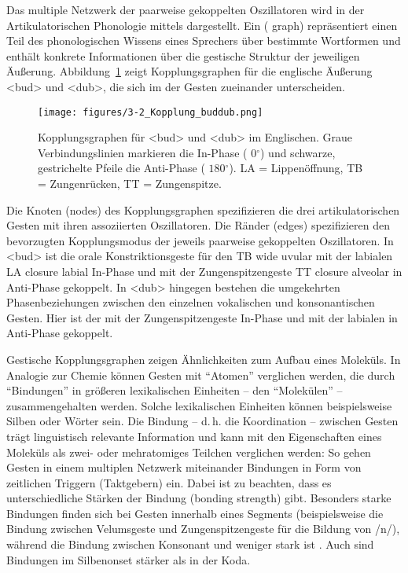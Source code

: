 Das multiple Netzwerk der paarweise gekoppelten Oszillatoren wird in der Artikulatorischen Phonologie mittels  dargestellt. Ein  ( graph) repräsentiert einen Teil des phonologischen Wissens eines Sprechers über bestimmte Wortformen \citep{Goldstein2007a} und enthält konkrete Informationen über die gestische Struktur der jeweiligen Äußerung. Abbildung~\ref{figure:0302} zeigt Kopplungsgraphen für die englische Äußerung <bud> und <dub>, die sich im  der Gesten zueinander unterscheiden. 


\begin{figure}[ht]
	\texttt{[image: figures/3-2\_Kopplung\_buddub.png]}
	\caption{Kopplungsgraphen für <bud> und <dub> im Englischen. Graue Verbindungslinien markieren die In-Phase ( $0{}^{\circ}$) und schwarze, gestrichelte Pfeile die Anti-Phase ( $180{}^{\circ}$). LA = Lippenöffnung, TB = Zungenrücken, TT = Zungenspitze.}
	\label{figure:0302}
\end{figure}

Die Knoten (nodes) des Kopplungsgraphen spezifizieren die drei artikulatorischen Gesten mit ihren assoziierten Oszillatoren. Die Ränder (edges) spezifizieren den bevorzugten Kopplungsmodus der jeweils paarweise gekoppelten Oszillatoren. In <bud> ist die orale Konstriktionsgeste für den  {TB wide uvular} mit der labialen  {LA closure labial} In-Phase und mit der Zungenspitzengeste {TT closure alveolar} in Anti-Phase gekoppelt. In <dub> hingegen bestehen die umgekehrten Phasenbeziehungen zwischen den einzelnen vokalischen und konsonantischen Gesten. Hier ist der  mit der Zungenspitzengeste In-Phase und mit der labialen  in Anti-Phase gekoppelt.

Gestische Kopplungsgraphen zeigen Ähnlichkeiten zum Aufbau eines Moleküls. In Analogie zur Chemie können Gesten mit \enquote{Atomen} verglichen werden, die durch \enquote{Bindungen} in größeren lexikalischen Einheiten -- den \enquote{Molekülen} -- zusammengehalten werden. Solche lexikalischen Einheiten können beispielsweise Silben oder Wörter sein. Die Bindung -- d.\,h. die Koordination -- zwischen Gesten trägt linguistisch relevante Information und kann mit den Eigenschaften eines Moleküls als zwei- oder mehratomiges Teilchen verglichen werden: So gehen Gesten in einem multiplen Netzwerk miteinander Bindungen in Form von zeitlichen Triggern (Taktgebern) ein. Dabei ist zu beachten, dass es unterschiedliche Stärken der Bindung (bonding strength) gibt. Besonders starke Bindungen finden sich bei Gesten innerhalb eines Segments (beispielsweise die Bindung zwischen Velumsgeste und Zungenspitzengeste für die Bildung von /n/), während die Bindung zwischen Konsonant und  weniger stark ist \citep{Goldstein2003}. Auch sind Bindungen im Silbenonset stärker als in der Koda.

